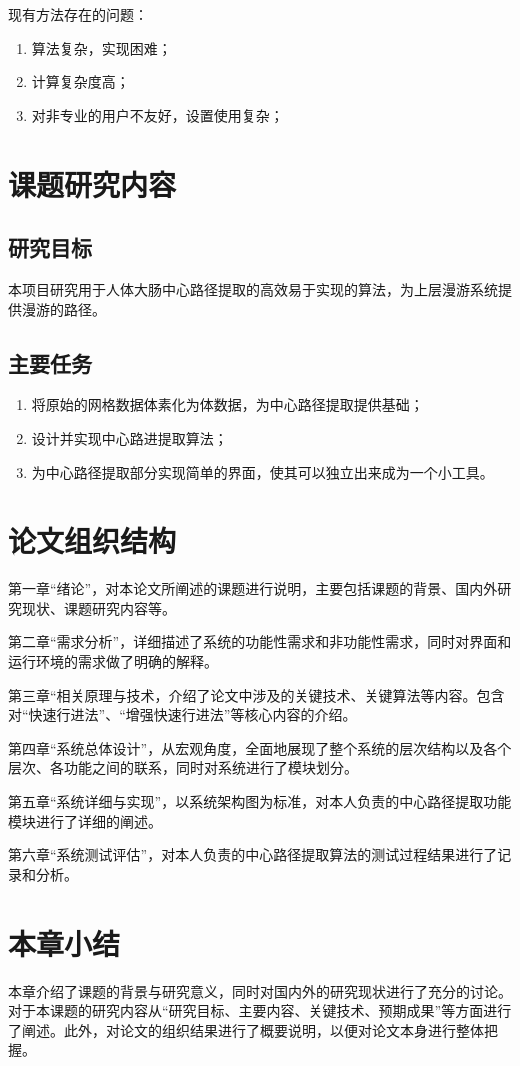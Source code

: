 现有方法存在的问题：
\begin{enumerate}
    \item 算法复杂，实现困难；
    \item 计算复杂度高；
　　\item 对非专业的用户不友好，设置使用复杂；
\end{enumerate}

\section{课题研究内容}
\subsection{研究目标}
本项目研究用于人体大肠中心路径提取的高效易于实现的算法，为上层漫游系统提供漫游的路径。

\subsection{主要任务}

\begin{enumerate}
    \item 将原始的网格数据体素化为体数据，为中心路径提取提供基础；
    \item 设计并实现中心路进提取算法；
    \item 为中心路径提取部分实现简单的界面，使其可以独立出来成为一个小工具。
\end{enumerate}

\section{论文组织结构}
第一章“绪论”，对本论文所阐述的课题进行说明，主要包括课题的背景、国内外研究现状、课题研究内容等。

第二章“需求分析”，详细描述了系统的功能性需求和非功能性需求，同时对界面和运行环境的需求做了明确的解释。

第三章“相关原理与技术，介绍了论文中涉及的关键技术、关键算法等内容。包含对“快速行进法”、“增强快速行进法”等核心内容的介绍。

第四章“系统总体设计”，从宏观角度，全面地展现了整个系统的层次结构以及各个层次、各功能之间的联系，同时对系统进行了模块划分。

第五章“系统详细与实现”，以系统架构图为标准，对本人负责的中心路径提取功能模块进行了详细的阐述。

第六章“系统测试评估”，对本人负责的中心路径提取算法的测试过程结果进行了记录和分析。

\section{本章小结}
本章介绍了课题的背景与研究意义，同时对国内外的研究现状进行了充分的讨论。对于本课题的研究内容从“研究目标、主要内容、关键技术、预期成果”等方面进行了阐述。此外，对论文的组织结果进行了概要说明，以便对论文本身进行整体把握。
